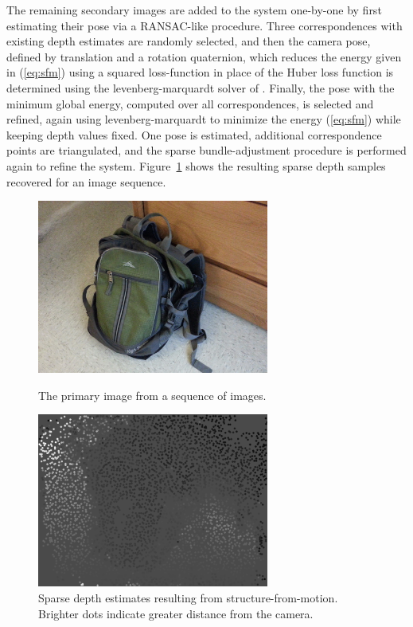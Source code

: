 \documentclass[conference]{acmsiggraph}
\begin{document}
The remaining secondary images are added to the system one-by-one
by first estimating their pose via a RANSAC-like procedure.
Three correspondences with existing depth estimates are randomly selected,
and then the camera pose, defined by translation and a rotation quaternion,
which reduces the energy given in (\ref{eq:sfm}) using a squared loss-function
in place of the Huber loss function is determined using the levenberg-marquardt
solver of \cite{ceres-solver}.  Finally, the pose with the minimum global
energy, computed over all correspondences, is selected and refined,
again using levenberg-marquardt to minimize the energy (\ref{eq:sfm}) while
keeping depth values fixed.  
One pose is estimated, additional correspondence points are triangulated,
and the sparse bundle-adjustment procedure is performed again to refine
the system.  Figure~\ref{fig:initial_depth} shows the resulting sparse depth
samples recovered for an image sequence.

\begin{figure}[ht]
  \centering
  \includegraphics[width=3in]{images/backpack}
  \caption{The primary image from a sequence of images.}
  \includegraphics[width=3in]{images/initial_depth}
  \caption{Sparse depth estimates resulting from structure-from-motion. Brighter
  dots indicate greater distance from the camera.}
  \label{fig:initial_depth}
\end{figure}
\end{document}
